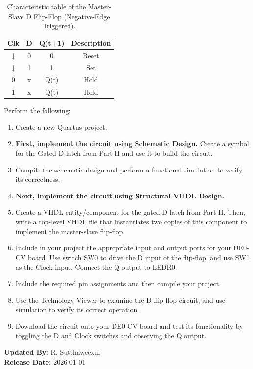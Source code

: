 \documentclass{article}
\begin{document}
\begin{table}[H]
    \centering
    \begin{tabular}{|c|c|c|c|}
        \hline
        Clk & D & Q(t+1) & Description \\
        \hline
        $\downarrow$ & 0 & 0 & Reset \\
        $\downarrow$ & 1 & 1 & Set \\
        0 & x & Q(t) & Hold \\
        1 & x & Q(t) & Hold \\
        \hline
    \end{tabular}
    \caption{Characteristic table of the Master-Slave D Flip-Flop (Negative-Edge Triggered).}
    \label{tab:ms_ff_char}
\end{table}

Perform the following:
\begin{enumerate}
    \item Create a new Quartus project.
    \item \textbf{First, implement the circuit using Schematic Design.} Create a symbol for the Gated D latch from Part II and use it to build the circuit.
    \item Compile the schematic design and perform a functional simulation to verify its correctness.
    \item \textbf{Next, implement the circuit using Structural VHDL Design.}
    \item Create a VHDL entity/component for the gated D latch from Part II. Then, write a top-level VHDL file that instantiates two copies of this component to implement the master-slave flip-flop.
    \item Include in your project the appropriate input and output ports for your DE0-CV board. Use switch SW0 to drive the D input of the flip-flop, and use SW1 as the Clock input. Connect the Q output to LEDR0.
    \item Include the required pin assignments and then compile your project.
    \item Use the Technology Viewer to examine the D flip-flop circuit, and use simulation to verify its correct operation.
    \item Download the circuit onto your DE0-CV board and test its functionality by toggling the D and Clock switches and observing the Q output.
\end{enumerate}

\vspace{1cm}
\noindent \textbf{Updated By:} R. Sutthaweekul \\
\textbf{Release Date:} 2026-01-01
\end{document}
